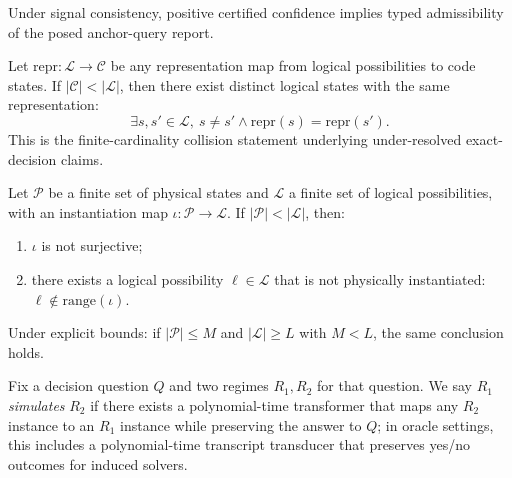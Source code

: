 \begin{corollary}\label{cor:posed-anchor-certified-gate}
Under signal consistency, positive certified confidence implies typed admissibility of the posed anchor-query report.
\end{corollary}

\begin{proposition}\label{prop:under-resolution-collision}
Let \(\mathrm{repr} : \mathcal{L} \to \mathcal{C}\) be any representation map from logical possibilities to code states. If \(|\mathcal{C}| < |\mathcal{L}|\), then there exist distinct logical states with the same representation:
\[
\exists s,s' \in \mathcal{L},\ s \neq s' \wedge \mathrm{repr}(s)=\mathrm{repr}(s').
\]
This is the finite-cardinality collision statement underlying under-resolved exact-decision claims.
\end{proposition}

\begin{theorem}\label{thm:physical-incompleteness}
Let $\mathcal{P}$ be a finite set of physical states and $\mathcal{L}$ a finite set of logical possibilities, with an instantiation map $\iota : \mathcal{P} \to \mathcal{L}$. If $|\mathcal{P}| < |\mathcal{L}|$, then:
\begin{enumerate}
\item $\iota$ is not surjective;
\item there exists a logical possibility $\ell \in \mathcal{L}$ that is not physically instantiated: $\ell \notin \mathrm{range}(\iota)$.
\end{enumerate}
Under explicit bounds: if $|\mathcal{P}| \le M$ and $|\mathcal{L}| \ge L$ with $M < L$, the same conclusion holds.
\end{theorem}

\begin{definition}\label{def:regime-simulation}
Fix a decision question $Q$ and two regimes $R_1,R_2$ for that question.
We say $R_1$ \emph{simulates} $R_2$ if there exists a polynomial-time transformer that maps any $R_2$ instance to an $R_1$ instance while preserving the answer to $Q$; in oracle settings, this includes a polynomial-time transcript transducer that preserves yes/no outcomes for induced solvers.
\end{definition}

